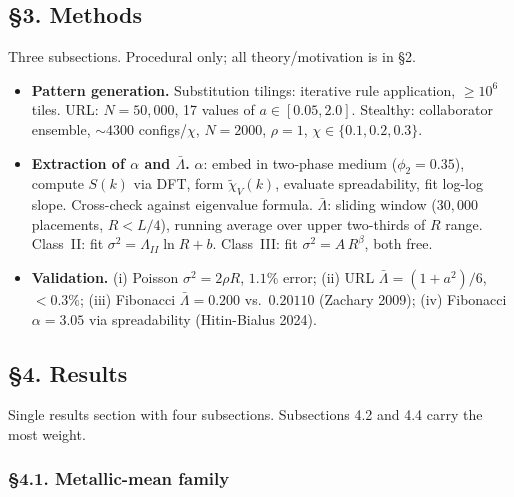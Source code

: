 \documentclass[11pt]{article}
\newcommand{\Lb}{\bar\Lambda}
\begin{document}
\subsection{\S3. Methods}

Three subsections. Procedural only; all theory/motivation is in \S2.

\begin{itemize}[leftmargin=1.5em]
  \item \textbf{Pattern generation.}
        Substitution tilings: iterative rule application, $\geq 10^6$ tiles.
        URL: $N = 50{,}000$, 17 values of $a \in [0.05, 2.0]$.
        Stealthy: collaborator ensemble, ${\sim}4300$ configs/$\chi$,
        $N = 2000$, $\rho = 1$, $\chi \in \{0.1, 0.2, 0.3\}$.

  \item \textbf{Extraction of $\alpha$ and $\Lb$.}
        $\alpha$: embed in two-phase medium ($\phi_2 = 0.35$),
        compute $S(k)$ via DFT, form $\tilde\chi_V(k)$,
        evaluate spreadability, fit log-log slope.
        Cross-check against eigenvalue formula.
        $\Lb$: sliding window ($30{,}000$ placements, $R < L/4$),
        running average over upper two-thirds of $R$ range.
        Class~II: fit $\sigma^2 = \Lambda_{II}\ln R + b$.
        Class~III: fit $\sigma^2 = A\,R^{\beta}$, both free.

  \item \textbf{Validation.}
        (i) Poisson $\sigma^2 = 2\rho R$, $1.1\%$ error;
        (ii) URL $\Lb = (1+a^2)/6$, $<0.3\%$;
        (iii) Fibonacci $\Lb = 0.200$ vs.\ $0.20110$ (Zachary 2009);
        (iv) Fibonacci $\alpha = 3.05$ via spreadability (Hitin-Bialus 2024).
\end{itemize}

\subsection{\S4. Results}

Single results section with four subsections. Subsections 4.2 and 4.4
carry the most weight.

\subsubsection{\S4.1. Metallic-mean family}
\end{document}
